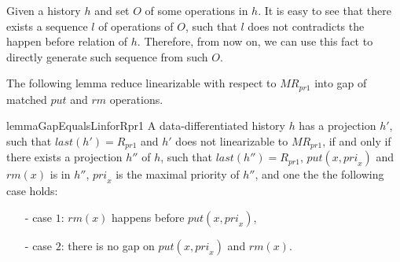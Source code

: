 Given a history $h$ and set $O$ of some operations in $h$. It is easy to see that there exists a sequence $l$ of operations of $O$, such that $l$ does not contradicts the happen before relation of $h$. Therefore, from now on, we can use this fact to directly generate such sequence from such $O$.


The following lemma reduce linearizable with respect to $\textit{MR}_{\textit{pr1}}$ into gap of matched $\textit{put}$ and $\textit{rm}$ operations.

\begin{restatable}{lemma}{GapEqualsLinforRpr1}
\label{lemma:Gap Equals Lin for Rpr1}
A data-differentiated history $h$ has a projection $h'$, such that $\textit{last}(h') = R_{\textit{pr1}}$ and $h'$ does not linearizable to $\textit{MR}_{\textit{pr1}}$, if and only if there exists a projection $h''$ of $h$, such that $\textit{last}(h'') = R_{\textit{pr1}}$, $\textit{put}(x,\textit{pri}_x)$ and $\textit{rm}(x)$ is in $h''$, $\textit{pri}_x$ is the maximal priority of $h''$, and one the the following case holds:

\begin{itemize}
\setlength{\itemsep}{0.5pt}
\item[-] case $1$: $\textit{rm}(x)$ happens before $\textit{put}(x,\textit{pri}_x)$,
\item[-] case $2$: there is no gap on $\textit{put}(x,\textit{pri}_x)$ and $\textit{rm}(x)$.
\end{itemize}
\end{restatable}

